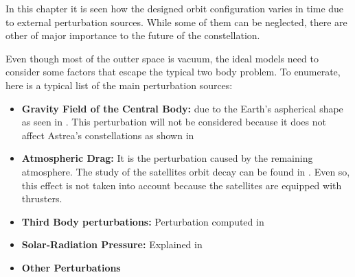 \label{TypesPerturb}

In this chapter it is seen how the designed orbit configuration varies in time due to external perturbation sources. While some of them can be neglected, there are other of major importance to the future of the constellation.

Even though most of the outter space is vacuum, the ideal models need to consider some factors that escape the typical two body problem. To enumerate, here is a typical list of the main perturbation sources:

\begin{itemize}
\item \textbf{Gravity Field of the Central Body:} due to the Earth's aspherical shape as seen in \cite[Chapter 4, Section 1]{annex1}. This perturbation will not be considered because it does not affect Astrea's constellations as shown in \cite[Chapter 4, Section 2]{annex1}
\item \textbf{Atmospheric Drag:} It is the perturbation caused by the remaining atmosphere. The study of the satellites orbit decay can be found in \cite[Chapter 4, Section 2]{annex1}. Even so, this effect is not taken into account because the satellites are equipped with thrusters.
\item \textbf{Third Body perturbations:} Perturbation computed in \cite[Chapter 4, Section 1]{annex1}
\item \textbf{Solar-Radiation Pressure:} Explained in \cite[Chapter 4, Section 2]{annex1}
\item \textbf{Other Perturbations}
\end{itemize}